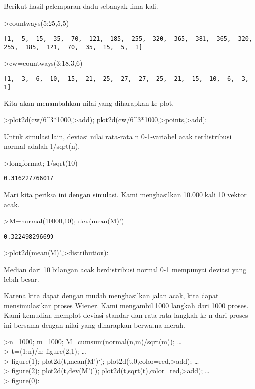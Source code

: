 \documentclass[
]{book}
\begin{document}
Berikut hasil pelemparan dadu sebanyak lima kali.

\textgreater countways(5:25,5,5)

\begin{verbatim}
[1,  5,  15,  35,  70,  121,  185,  255,  320,  365,  381,  365,  320,
255,  185,  121,  70,  35,  15,  5,  1]
\end{verbatim}

\textgreater cw=countways(3:18,3,6)

\begin{verbatim}
[1,  3,  6,  10,  15,  21,  25,  27,  27,  25,  21,  15,  10,  6,  3,
1]
\end{verbatim}

Kita akan menambahkan nilai yang diharapkan ke plot.

\textgreater plot2d(cw/6\^{}3*1000,\textgreater add); plot2d(cw/6\^{}3*1000,\textgreater points,\textgreater add):

Untuk simulasi lain, deviasi nilai rata-rata n 0-1-variabel acak terdistribusi normal adalah 1/sqrt(n).

\textgreater longformat; 1/sqrt(10)

\begin{verbatim}
0.316227766017
\end{verbatim}

Mari kita periksa ini dengan simulasi. Kami menghasilkan 10.000 kali 10 vektor acak.

\textgreater M=normal(10000,10); dev(mean(M)')

\begin{verbatim}
0.322498296699
\end{verbatim}

\textgreater plot2d(mean(M)',\textgreater distribution):

Median dari 10 bilangan acak berdistribusi normal 0-1 mempunyai deviasi yang lebih besar.

Karena kita dapat dengan mudah menghasilkan jalan acak, kita dapat mensimulasikan proses Wiener. Kami mengambil 1000 langkah dari 1000 proses. Kami kemudian memplot deviasi standar dan rata-rata langkah ke-n dari proses ini bersama dengan nilai yang diharapkan berwarna merah.

\textgreater n=1000; m=1000; M=cumsum(normal(n,m)/sqrt(m)); \ldots{}\\
\textgreater{} t=(1:n)/n; figure(2,1); \ldots{}\\
\textgreater{} figure(1); plot2d(t,mean(M')`); plot2d(t,0,color=red,\textgreater add); \ldots{}\\
\textgreater{} figure(2); plot2d(t,dev(M')'); plot2d(t,sqrt(t),color=red,\textgreater add); \ldots{}\\
\textgreater{} figure(0):
\end{document}
